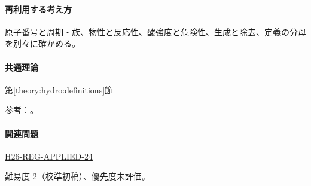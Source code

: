 \paragraph{再利用する考え方} 原子番号と周期・族、物性と反応性、酸強度と危険性、生成と除去、定義の分母を別々に確かめる。

\paragraph{共通理論} \hyperref[theory:hydro:definitions]{第\ref*{theory:hydro:definitions}節}

\par 参考：\cite{inorganic_hydro_ref,inorganic_waterbudget}。

\paragraph{関連問題} \hyperref[q:h26-reg-applied-24]{H26-REG-APPLIED-24}

\par 難易度 2（校準初稿）、優先度未評価。
